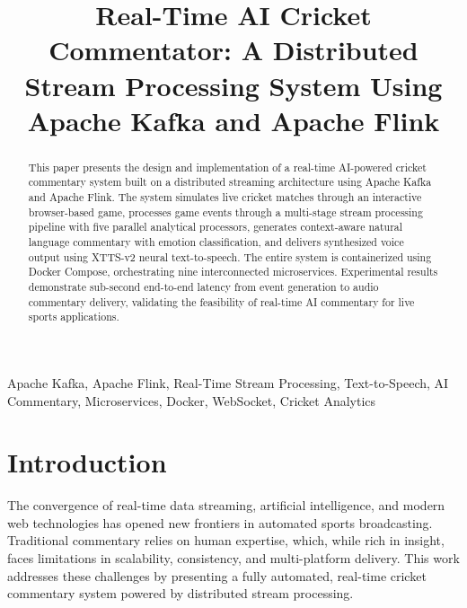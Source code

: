 \documentclass[conference]{IEEEtran}
\begin{document}
\title{Real-Time AI Cricket Commentator: A Distributed Stream Processing System Using Apache Kafka and Apache Flink}

\author{
}

\maketitle

\begin{abstract}
This paper presents the design and implementation of a real-time AI-powered cricket commentary system built on a distributed streaming architecture using Apache Kafka and Apache Flink. The system simulates live cricket matches through an interactive browser-based game, processes game events through a multi-stage stream processing pipeline with five parallel analytical processors, generates context-aware natural language commentary with emotion classification, and delivers synthesized voice output using XTTS-v2 neural text-to-speech. The entire system is containerized using Docker Compose, orchestrating nine interconnected microservices. Experimental results demonstrate sub-second end-to-end latency from event generation to audio commentary delivery, validating the feasibility of real-time AI commentary for live sports applications.
\end{abstract}

\begin{IEEEkeywords}
Apache Kafka, Apache Flink, Real-Time Stream Processing, Text-to-Speech, AI Commentary, Microservices, Docker, WebSocket, Cricket Analytics
\end{IEEEkeywords}

\section{Introduction}

The convergence of real-time data streaming, artificial intelligence, and modern web technologies has opened new frontiers in automated sports broadcasting. Traditional commentary relies on human expertise, which, while rich in insight, faces limitations in scalability, consistency, and multi-platform delivery. This work addresses these challenges by presenting a fully automated, real-time cricket commentary system powered by distributed stream processing.
\end{document}
